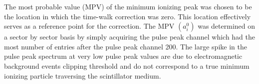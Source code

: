 The most probable value (MPV) of the minimum ionizing peak was chosen to be the location in which the time-walk correction was zero.  This location effectively serves as a reference point for the correction.  
The MPV $(a^{0}_{i})$ was determined on a sector by sector basis by simply acquiring the pulse peak channel which had the most number of entries after the pulse peak channel 200.  The large spike in the pulse peak spectrum at very low pulse peak values are due to electromagnetic background events clipping threshold and do not correspond to a true minimum ionizing particle traversing the scintillator medium.

